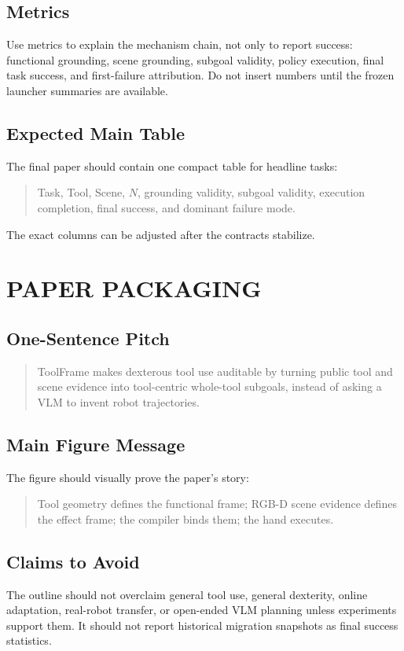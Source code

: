 \documentclass[letterpaper, 10 pt, conference]{ieeeconf}
\newcommand{\method}{ToolFrame}
\begin{document}
\subsection{Metrics}
Use metrics to explain the mechanism chain, not only to report success:
functional grounding, scene grounding, subgoal validity, policy execution,
final task success, and first-failure attribution. Do not insert numbers until
the frozen launcher summaries are available.

\subsection{Expected Main Table}
The final paper should contain one compact table for headline tasks:
\begin{quote}
Task, Tool, Scene, $N$, grounding validity, subgoal validity, execution
completion, final success, and dominant failure mode.
\end{quote}
The exact columns can be adjusted after the contracts stabilize.

\section{PAPER PACKAGING}

\subsection{One-Sentence Pitch}
\begin{quote}
\method{} makes dexterous tool use auditable by turning public tool and scene
evidence into tool-centric whole-tool subgoals, instead of asking a VLM to
invent robot trajectories.
\end{quote}

\subsection{Main Figure Message}
The figure should visually prove the paper's story:
\begin{quote}
Tool geometry defines the functional frame; RGB-D scene evidence defines the
effect frame; the compiler binds them; the hand executes.
\end{quote}

\subsection{Claims to Avoid}
The outline should not overclaim general tool use, general dexterity, online
adaptation, real-robot transfer, or open-ended VLM planning unless experiments
support them. It should not report historical migration snapshots as final
success statistics.
\end{document}
